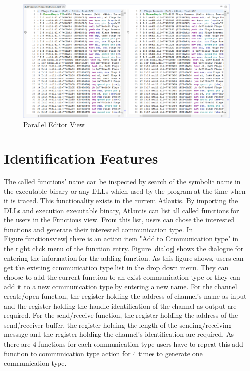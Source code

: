 \begin{figure}[H]
\centerline{\includegraphics[scale=0.48]{Figures/paralleleditor}}
 \caption{Parallel Editor View}
\label{paralleleditor}
\end{figure}



\section{Identification Features}
The called functions' name can be inspected  by  search of the symbolic name in the executable binary or any DLLs which used by the program at the time when it is traced. This functionality exists in the current Atlantis. By importing the DLLs and execution  executable binary, Atlantis can list all called functions for the users in the Functions view. From this list, users can chose the interested functions and generate their interested communication type. In Figure\ref{functionsview} there is  an action item "Add to Communication type" in the right click menu of the function entry. Figure \ref{dialog} shows the dialogue for entering the information for the adding function. As this figure shows, users can get the existing communication type list in the drop down menu. They can choose to add the current function to an exist communication type or they can add it to a new communication type by entering a new name. For the channel create/open function, the register holding the address of channel's name as input and the register holding the handle identification of the channel as output are required. For the send/receive function, the register holding the address of the send/receiver buffer, the register holding the length of the sending/receiving message and the register holding the channel's identification are required. As there are 4 functions for each communication type users have to repeat this add function to communication type action for 4 times to generate one communication type.

